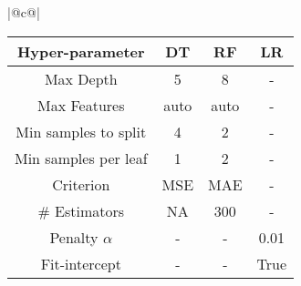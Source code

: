 \begin{table}[t]
\begin{tabular}{|@{}c@{}|}
\end{tabular}

\medskip
\fi 

\centering

\begin{tabular}{|@{}c@{}|}
\hline

    \begin{tabular}{c|c|c|c}
        \textbf{Hyper-parameter} & \textbf{DT} & \textbf{RF} & \textbf{LR}  \\ \hline
        Max Depth &  5 & 8 & - \\
        Max Features & auto & auto & - \\
        Min samples to split & 4 & 2 & - \\
        Min samples per leaf & 1 & 2 & - \\
        Criterion & MSE & MAE & - \\
        \# Estimators & NA & 300 & - \\
         Penalty $\alpha$ & - & - & 0.01\\
        Fit-intercept & - & - & True
    \end{tabular}

    \\ \hline
    
\end{tabular}

\end{table}